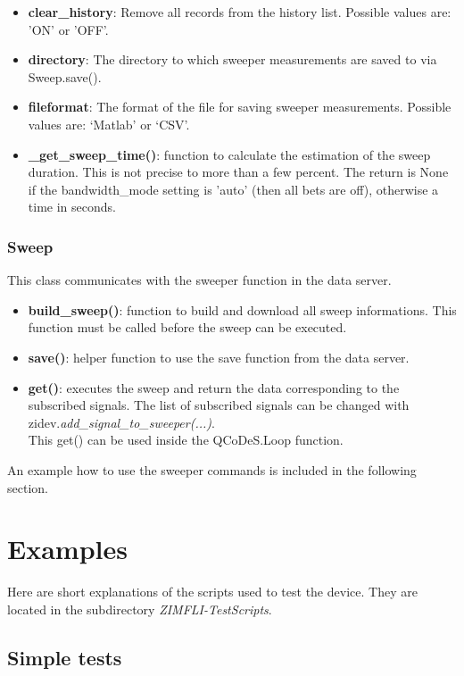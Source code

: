 \documentclass[11pt]{article} %
\begin{document}
\begin{itemize}
\item {\bf clear\_history}: Remove all records from the history list. Possible values are: 'ON' or 'OFF'.
\item {\bf directory}: The directory to which sweeper measurements are saved to via Sweep.save().
\item {\bf fileformat}: The format of the file for saving sweeper measurements. Possible values are: `Matlab' or `CSV'.
\item {\bf \_get\_sweep\_time()}: function to calculate the estimation of the sweep duration. This is not precise to more than a few percent. The return is None if the bandwidth\_mode setting is 'auto' (then all bets are off), otherwise a time in seconds.
\end{itemize}

\subsubsection{Sweep}
This class communicates with the sweeper function in the data server.
\begin{itemize}
\item {\bf build\_sweep()}: function to build and download all sweep informations. This function must be called before the sweep can be executed.
\item {\bf save()}: helper function to use the save function from the data server.
\item {\bf get()}: executes the sweep and return the data corresponding to the subscribed signals. The list of subscribed signals can be changed with zidev.{\it add\_signal\_to\_sweeper(...)}. \\
This get() can be used inside the QCoDeS.Loop function.
\end{itemize}
An example how to use the sweeper commands is included in the following section.

\clearpage

\section{Examples}

Here are short explanations of the scripts used to test the device. They are located in the subdirectory {\it ZIMFLI-TestScripts}.


\subsection{Simple tests}
\end{document}
